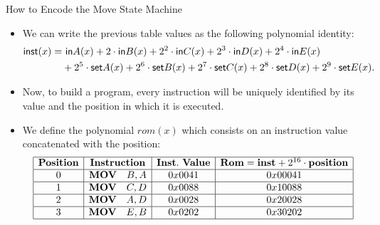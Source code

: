 \begin{frame}[allowframebreaks]{How to Encode the Move State Machine}
\begin{itemize}
\item We can write the previous table values as the following polynomial identity:
\begin{align*}
\mathsf{inst}(x) = &~\mathsf{in} A(x) + 2 \cdot \mathsf{in} B(x) + 2^2 \cdot \mathsf{in} C(x) + 2^3 \cdot \mathsf{in} D(x) + 2^4 \cdot \mathsf{in} E(x) \\
& + 2^5 \cdot \mathsf{set} A(x) + 2^6 \cdot \mathsf{set} B(x) + 2^7 \cdot \mathsf{set} C(x) + 2^8 \cdot \mathsf{set} D(x) + 2^9 \cdot \mathsf{set} E(x).
\end{align*}

\item Now, to build a program, every instruction will be uniquely identified by its value and the position in which it is executed.
\item We define the polynomial $rom(x)$ which consists on an instruction value concatenated with the position:
\[
\begin{array}{|c|c|c|c|}
\hline
\mathbf{Position} & \mathbf{Instruction} & \mathbf{Inst.~Value} & \mathbf{Rom} = \mathbf{inst} + 2^{16} \cdot \mathbf{position} \\ \hline
0 & \mathbf{MOV} \quad B, A & 0x0041 & 0x00041 \\ \hline
1 & \mathbf{MOV} \quad C, D & 0x0088 & 0x10088 \\ \hline
2 & \mathbf{MOV} \quad A, D & 0x0028 & 0x20028 \\ \hline
3 & \mathbf{MOV} \quad E, B & 0x0202 & 0x30202 \\ \hline
\end{array}
\]
\end{itemize}
\end{frame}